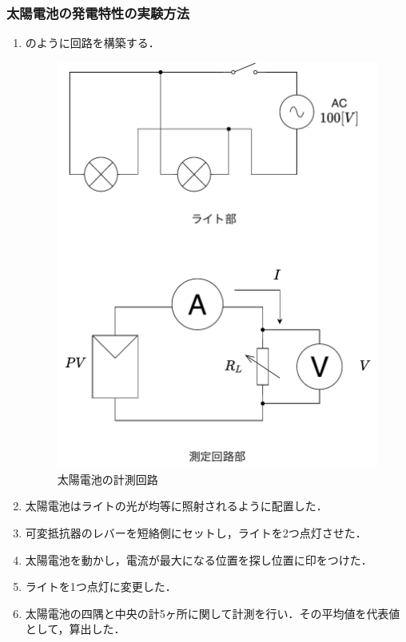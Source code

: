 \subsubsection{太陽電池の発電特性の実験方法}
\begin{enumerate}[(1)]
	\item {}のように回路を構築する．
	\begin{figure}[h]
	\centering
	\includegraphics[scale=0.5]{./fig/solar-cell.pdf}
	\caption{太陽電池の計測回路}
	\label{fig:solar-cell}
	\end{figure}
	\item 太陽電池はライトの光が均等に照射されるように配置した．
	\item 可変抵抗器のレバーを短絡側にセットし，ライトを2つ点灯させた．
	\item 太陽電池を動かし，電流が最大になる位置を探し位置に印をつけた．
	\item ライトを1つ点灯に変更した．
	\item 太陽電池の四隅と中央の計5ヶ所に関して計測を行い．その平均値を代表値として，算出した．

\end{enumerate}

